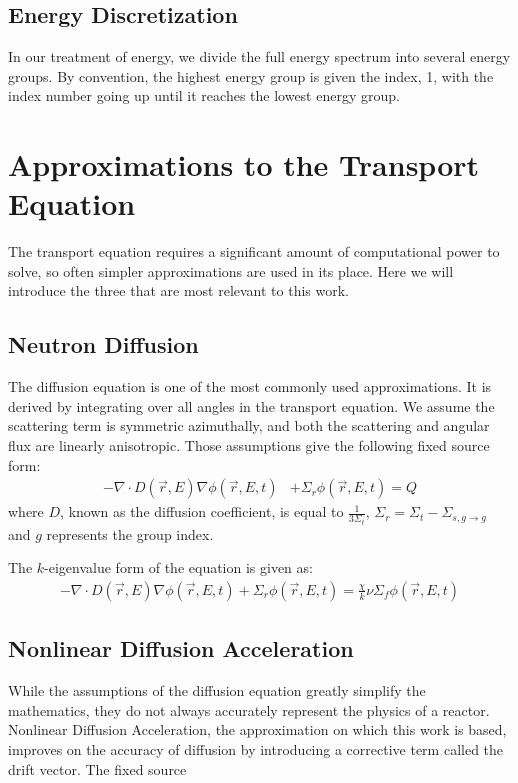 \subsection{Energy Discretization}
In our treatment of energy, we divide the full energy spectrum into several energy groups. By convention, the highest energy group is given the index, 1, with the index number going up until it reaches the lowest energy group. 

\section{Approximations to the Transport Equation}
The transport equation requires a significant amount of computational power to solve, so often simpler approximations are used in its place. Here we will introduce the three that are most relevant to this work.

\subsection{Neutron Diffusion}
The diffusion equation is one of the most commonly used approximations. It is derived by integrating over all angles in the transport equation. We assume the scattering term is symmetric azimuthally, and both the scattering and angular flux are linearly anisotropic. Those assumptions give the following fixed source form:
\begin{equation}
\begin{split}
 - \nabla \cdot D(\vec{r}, E)\nabla\phi(\vec{r}, E, t) &+ \Sigma_r \phi(\vec{r}, E, t) = Q
\end{split}
\label{eq:diffusion_fixed_source}
\end{equation}
where $D$, known as the diffusion coefficient, is equal to $\frac{1}{3\Sigma_t}$, $\Sigma_r = \Sigma_t - \Sigma_{s, g \rightarrow g}$ and $g$ represents the group index. 

The $k$-eigenvalue form of the equation is given as:
\begin{equation}
    \begin{split}
         - \nabla \cdot D(\vec{r}, E)\nabla\phi(\vec{r}, E, t) + \Sigma_r \phi(\vec{r}, E, t) =  \frac{\chi}{k}\nu\Sigma_f\phi(\vec{r}, E, t) 
    \end{split}
    \label{eq:diffusion_eigenvalue}
\end{equation}

\subsection{Nonlinear Diffusion Acceleration}
While the assumptions of the diffusion equation greatly simplify the mathematics, they do not always accurately represent the physics of a reactor. Nonlinear Diffusion Acceleration, the approximation on which this work is based, improves on the accuracy of diffusion by introducing a corrective term called the drift vector. The fixed source
